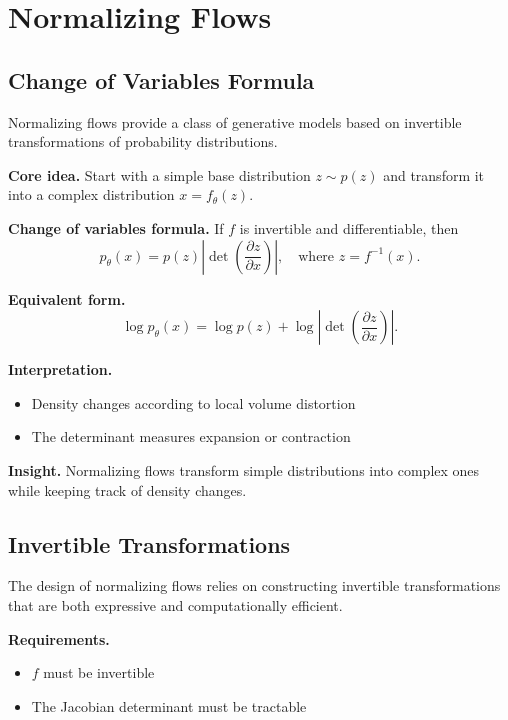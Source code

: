 \chapter{Normalizing Flows}

\section{Change of Variables Formula}

Normalizing flows provide a class of generative models based on invertible transformations of probability distributions.

\medskip

\noindent
\textbf{Core idea.}  
Start with a simple base distribution $z \sim p(z)$ and transform it into a complex distribution $x = f_\theta(z)$.

\medskip

\noindent
\textbf{Change of variables formula.}  
If $f$ is invertible and differentiable, then
\[
p_\theta(x)
=
p(z) \left| \det \left( \frac{\partial z}{\partial x} \right) \right|,
\quad \text{where } z = f^{-1}(x).
\]

\medskip

\noindent
\textbf{Equivalent form.}
\[
\log p_\theta(x)
=
\log p(z)
+
\log \left| \det \left( \frac{\partial z}{\partial x} \right) \right|.
\]

\medskip

\noindent
\textbf{Interpretation.}
\begin{itemize}
    \item Density changes according to local volume distortion
    \item The determinant measures expansion or contraction
\end{itemize}

\medskip

\noindent
\textbf{Insight.}  
Normalizing flows transform simple distributions into complex ones while keeping track of density changes.

\section{Invertible Transformations}

The design of normalizing flows relies on constructing invertible transformations that are both expressive and computationally efficient.

\medskip

\noindent
\textbf{Requirements.}
\begin{itemize}
    \item $f$ must be invertible
    \item The Jacobian determinant must be tractable
\end{itemize}

